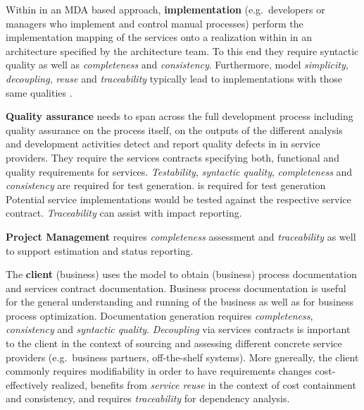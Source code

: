 Within in an MDA based approach, {\bf implementation} (e.g.\ developers or managers who implement and control manual processes) perform the implementation mapping of the services onto a realization within in an architecture specified by the architecture team. To this end they require syntactic quality as well as \emph{completeness} and \emph{consistency}. Furthermore, model \emph{simplicity}, \emph{decoupling}, \emph{reuse} and \emph{traceability} typically lead to implementations with those same qualities \cite{podgorelec_estimating_2007}.

{\bf Quality assurance} needs to span across the full development process including quality assurance on the process itself, on the outputs of the different analysis and development activities detect and report quality defects in in service providers. They require the services contracts specifying both, functional and quality requirements for services. \emph{Testability}, \emph{syntactic quality}, \emph{completeness} and \emph{consistency} are required for test generation. is required for test generation Potential service implementations would be tested against the respective service contract. \emph{Traceability} can assist with impact reporting.

{\bf Project Management} requires \emph{completeness} assessment and \emph{traceability} as well to support estimation and status reporting.

The {\bf client} (business) uses the model to obtain (business) process documentation and services contract documentation. Business process documentation is useful for the general understanding and running of the business as well as for business process optimization. Documentation generation requires \emph{completeness}, \emph{consistency} and \emph{syntactic quality}. \emph{Decoupling} via services contracts is important to the client in the context of sourcing and assessing different concrete service providers (e.g.\ business partners, off-the-shelf systems). More gnereally, the client commonly requires modifiability in order to have requirements changes cost-effectively realized, benefits from \emph{service reuse} in the context of cost containment and consistency, and requires \emph{traceability} for dependency analysis.

